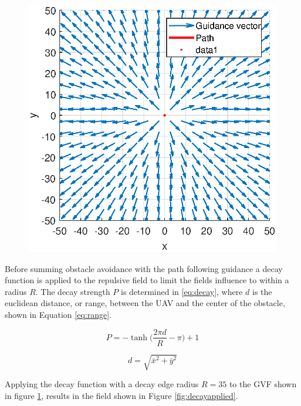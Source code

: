 \documentclass[conf]{new-aiaa}
\begin{document}
\begin{figure}[H]
	\centering
	\includegraphics[width=0.7\linewidth]{Figures/methods/normalizedRepulsive}
	\caption{}
	\label{fig:normalizedrepulsive}
\end{figure}

Before summing obstacle avoidance with the path following guidance a decay function is applied to the repulsive field to limit the fields influence to within a radius $R$. The decay strength $P$ is determined in \ref{eq:decay}, where $d$ is the euclidean distance, or range, between the UAV and the center of the obstacle, shown in Equation \ref{eq:range}.


\begin{equation}
\label{eq:decay}
P = -\tanh \bigg( \frac{2\pi d}{R}-\pi\bigg)+1
\end{equation}

\begin{equation}
\label{eq:range}
d = \sqrt{ \bar{x}^2+\bar{y}^2}
\end{equation}

Applying the decay function with a decay edge radius $R = 35$ to the GVF shown in figure \ref{fig:normalizedrepulsive}, results in the field shown in Figure \ref{fig:decayapplied}.


\end{document}
